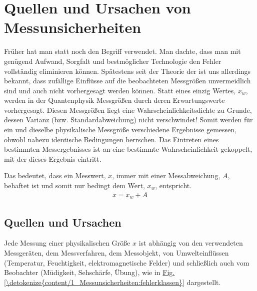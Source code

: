 \documentclass[letterpaper,10pt,english]{jupyterBook}
\begin{document}
\sphinxstepscope


\section{Quellen und Ursachen von Messunsicherheiten}
\label{\detokenize{content/1_Messunsicherheiten:quellen-und-ursachen-von-messunsicherheiten}}\label{\detokenize{content/1_Messunsicherheiten::doc}}
\sphinxAtStartPar
Früher hat man statt  noch den Begriff  verwendet. Man dachte, dass man mit genügend Aufwand, Sorgfalt und bestmöglicher Technologie den Fehler vollständig eliminieren können. Spätestens seit der Theorie der  ist uns allerdings bekannt, dass zufällige Einflüsse auf die beobachteten Messgrößen  unvermeidlich sind und auch nicht vorhergesagt werden können. Statt eines einzig  Wertes, \(x_w\), werden in der Quantenphysik Messgrößen durch deren Erwartungswerte vorhergesagt. Diesen Messgrößen liegt eine Wahrscheinlichkeitsdichte zu Grunde, dessen Varianz (bzw. Standardabweichung) nicht verschwindet! Somit werden für ein und dieselbe physikalische Messgröße verschiedene Ergebnisse gemessen, obwohl nahezu identische Bedingungen herrschen. Das Eintreten eines bestimmten Messergebnisses ist an eine bestimmte Wahrscheinlichkeit gekoppelt, mit der dieses Ergebnis eintritt.

\sphinxAtStartPar
Das bedeutet, dass ein Messwert, \(x\), immer mit einer Messabweichung, \(A\), behaftet ist und somit nur bedingt dem  Wert, \(x_w\), entspricht.
\begin{equation*}
\begin{split}x = x_w + A\end{split}
\end{equation*}

\subsection{Quellen und Ursachen}
\label{\detokenize{content/1_Messunsicherheiten:quellen-und-ursachen}}
\sphinxAtStartPar
Jede Messung einer physikalischen Größe \(x\) ist abhängig von den verwendeten Messgeräten, dem Messverfahren, dem Messobjekt, von Umwelteinflüssen (Temperatur, Feuchtigkeit, elektromagnetische Felder) und schließlich auch vom Beobachter (Müdigkeit, Sehschärfe, Übung), wie in \hyperref[\detokenize{content/1_Messunsicherheiten:fehlerklassen}]{Fig.\@ \ref{\detokenize{content/1_Messunsicherheiten:fehlerklassen}}} dargestellt.
\end{document}
